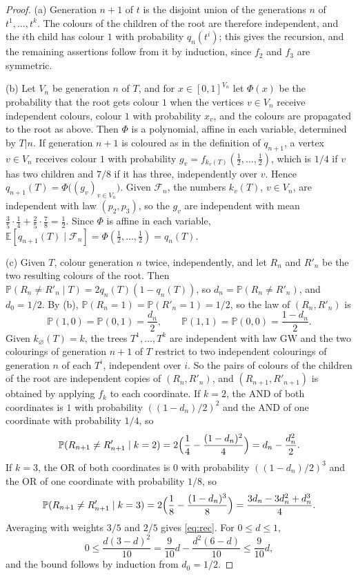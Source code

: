 \documentclass[11pt]{amsart}
\theoremstyle{remark}
\numberwithin{equation}{section}
\newcommand{\Pp}{\mathbb P}
\newcommand{\E}{\mathbb E}
\newcommand{\GW}{\mathrm{GW}}
\begin{document}
\begin{proof}
(a) Generation $n+1$ of $t$ is the disjoint union of the generations $n$ of $t^1,\dots,t^k$. The colours of the children of the root are therefore independent, and the $i$th child has colour $1$ with probability $q_n(t^i)$; this gives the recursion, and the remaining assertions follow from it by induction, since $f_2$ and $f_3$ are symmetric.

(b) Let $V_n$ be generation $n$ of $T$, and for $x\in[0,1]^{V_n}$ let $\Phi(x)$ be the probability that the root gets colour $1$ when the vertices $v\in V_n$ receive independent colours, colour $1$ with probability $x_v$, and the colours are propagated to the root as above. Then $\Phi$ is a polynomial, affine in each variable, determined by $T|n$. If generation $n+1$ is coloured as in the definition of $q_{n+1}$, a vertex $v\in V_n$ receives colour $1$ with probability $g_v=f_{k_v(T)}(\frac12,\dots,\frac12)$, which is $1/4$ if $v$ has two children and $7/8$ if it has three, independently over $v$. Hence $q_{n+1}(T)=\Phi\bigl((g_v)_{v\in V_n}\bigr)$. Given $\mathcal F_n$, the numbers $k_v(T)$, $v\in V_n$, are independent with law $(p_2,p_3)$, so the $g_v$ are independent with mean $\frac35\cdot\frac14+\frac25\cdot\frac78=\frac12$. Since $\Phi$ is affine in each variable, $\E[q_{n+1}(T)\mid\mathcal F_n]=\Phi(\frac12,\dots,\frac12)=q_n(T)$.

(c) Given $T$, colour generation $n$ twice, independently, and let $R_n$ and $R'_n$ be the two resulting colours of the root. Then $\Pp(R_n\ne R'_n\mid T)=2q_n(T)(1-q_n(T))$, so $d_n=\Pp(R_n\ne R'_n)$, and $d_0=1/2$. By (b), $\Pp(R_n=1)=\Pp(R'_n=1)=1/2$, so the law of $(R_n,R'_n)$ is
\[
\Pp(1,0)=\Pp(0,1)=\frac{d_n}2,\qquad \Pp(1,1)=\Pp(0,0)=\frac{1-d_n}2 .
\]
Given $k_\varnothing(T)=k$, the trees $T^1,\dots,T^k$ are independent with law $\GW$ and the two colourings of generation $n+1$ of $T$ restrict to two independent colourings of generation $n$ of each $T^i$, independent over $i$. So the pairs of colours of the children of the root are independent copies of $(R_n,R'_n)$, and $(R_{n+1},R'_{n+1})$ is obtained by applying $f_k$ to each coordinate. If $k=2$, the AND of both coordinates is $1$ with probability $((1-d_n)/2)^2$ and the AND of one coordinate with probability $1/4$, so
\[
\Pp(R_{n+1}\ne R'_{n+1}\mid k=2)=2\Bigl(\frac14-\frac{(1-d_n)^2}4\Bigr)=d_n-\frac{d_n^2}2 .
\]
If $k=3$, the OR of both coordinates is $0$ with probability $((1-d_n)/2)^3$ and the OR of one coordinate with probability $1/8$, so
\[
\Pp(R_{n+1}\ne R'_{n+1}\mid k=3)=2\Bigl(\frac18-\frac{(1-d_n)^3}8\Bigr)=\frac{3d_n-3d_n^2+d_n^3}4 .
\]
Averaging with weights $3/5$ and $2/5$ gives \eqref{eq:rec}. For $0\le d\le1$,
\[
0\le\frac{d(3-d)^2}{10}=\frac9{10}d-\frac{d^2(6-d)}{10}\le\frac9{10}d ,
\]
and the bound follows by induction from $d_0=1/2$.
\end{proof}
\end{document}
